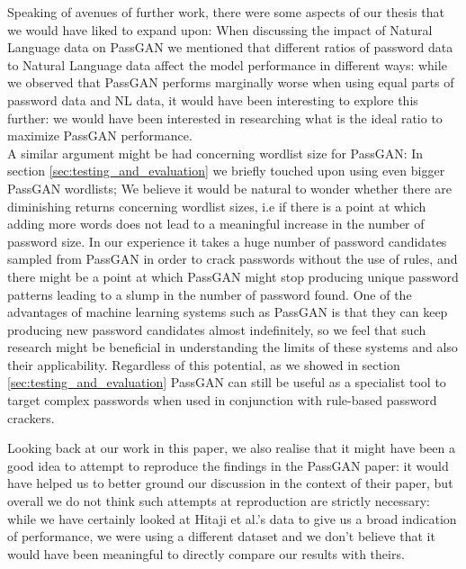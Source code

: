 Speaking of avenues of further work, there were some aspects of our thesis that we would have liked to expand upon:
When discussing the impact of Natural Language data on PassGAN we mentioned that different ratios of password data to Natural Language data affect the model performance in different ways: while we observed 
that PassGAN performs marginally worse when using equal parts of password data and NL data, it would have been interesting to explore this further: we would have been interested in researching what is the ideal ratio to maximize PassGAN performance. \\
A similar argument might be had concerning wordlist size for PassGAN: In section \ref{sec:testing_and_evaluation} we briefly touched upon using even bigger PassGAN wordlists; We believe it would be natural to wonder whether there are diminishing returns concerning wordlist sizes, i.e if there is a point at which adding more words does not lead to a meaningful increase in the number of password size.
In our experience it takes a huge number of password candidates sampled from PassGAN in order to crack passwords without the use of rules, and there might be a point at which PassGAN might stop producing 
unique password patterns leading to a slump in the number of password found. One of the advantages of machine learning systems such as PassGAN is that they can keep producing new password candidates almost 
indefinitely, so we feel that such research might be beneficial in understanding the limits of these systems and also their applicability. Regardless of this potential, as we showed in section 
\ref{sec:testing_and_evaluation} PassGAN can still be useful as a specialist tool to target complex passwords when used in conjunction with rule-based password crackers.

Looking back at our work in this paper, we also realise that it might have been a good idea to attempt to reproduce the findings in the PassGAN paper: it would have helped us to better ground our discussion 
in the context of their paper, but overall we do not think such attempts at reproduction are strictly necessary: while we have certainly looked at Hitaji et al.'s data to give us a broad indication of performance, we were using a different dataset and we don't believe that it would have been meaningful to directly compare our results with theirs.

